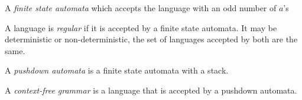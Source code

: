 
A \emph{finite state automata} which accepts the language with an odd
number of $a$'s
\begin{center}
\end{center}

A language is \emph{regular} if it is accepted by a finite state automata.
It may be deterministic or non-deterministic, the set of languages accepted
by both are the same.

A \emph{pushdown automata} is a finite state automata with a stack.

A \emph{context-free grammar} is a language that is accepted by a pushdown
automata.
